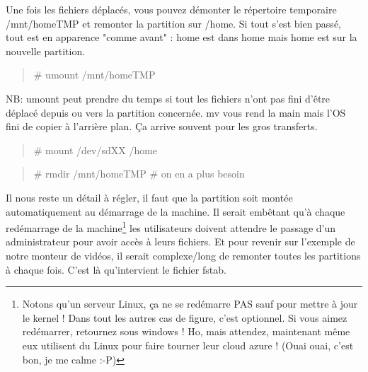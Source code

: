 \documentclass[a4paper,11pt]{article}
\newcommand{\commande}[1] {
    \begin{quote}
    \tt\raggedright #1 
    \end{quote}
}
\begin{document}
\par Une fois les fichiers déplacés, vous pouvez démonter le répertoire temporaire /mnt/homeTMP et remonter la partition sur /home. Si tout s'est bien passé, tout est en apparence "comme avant" : home est dans home mais home est sur la nouvelle partition.
\commande{\# umount /mnt/homeTMP}
\par NB: umount peut prendre du temps si tout les fichiers n'ont pas fini d'être déplacé depuis ou vers la partition concernée. mv vous rend la main mais l'OS fini de copier à l'arrière plan. Ça arrive souvent pour les gros transferts.
\commande{\# mount /dev/sdXX /home}
\commande{\# rmdir /mnt/homeTMP \# on en a plus besoin}
\par Il nous reste un détail à régler, il faut que la partition soit montée automatiquement au démarrage de la machine. Il serait embêtant qu'à chaque redémarrage de la machine\footnote{Notons qu'un serveur Linux, ça ne se redémarre PAS sauf pour mettre à jour le kernel ! Dans tout les autres cas de figure, c'est optionnel. Si vous aimez redémarrer, retournez sous windows ! Ho, mais attendez, maintenant même eux utilisent du Linux pour faire tourner leur cloud azure ! (Ouai ouai, c'est bon, je me calme :-P)} les utilisateurs doivent attendre le passage d'un administrateur pour avoir accès à leurs fichiers. Et pour revenir sur l'exemple de notre monteur de vidéos, il serait complexe/long de remonter toutes les partitions à chaque fois. C'est là qu'intervient le fichier fstab.
\end{document}
